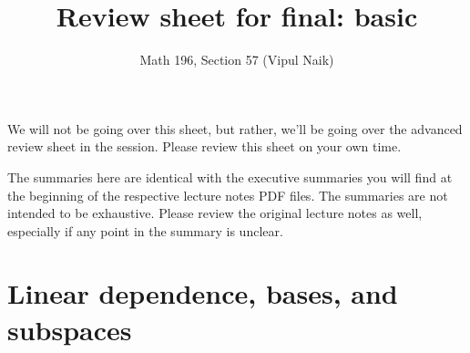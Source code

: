 \documentclass[10pt]{amsart}
\title{Review sheet for final: basic}
\author{Math 196, Section 57 (Vipul Naik)}
\begin{document}
\maketitle

We will not be going over this sheet, but rather, we'll be going over
the advanced review sheet in the session. Please review this sheet on
your own time.

The summaries here are identical with the executive summaries you will
find at the beginning of the respective lecture notes PDF files. The
summaries are not intended to be exhaustive. Please review the
original lecture notes as well, especially if any point in the summary
is unclear.

\section{Linear dependence, bases, and subspaces}
\end{document}
